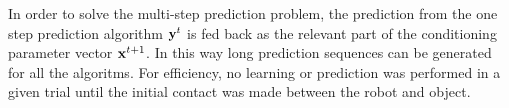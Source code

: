 %
%

In order to solve the multi-step prediction problem, the prediction from the one step prediction algorithm $\mathbf{y}^t$ is fed back as the relevant part of the conditioning parameter vector $\mathbf{x}^{t+1}$. In this way long prediction sequences can be generated for all the algoritms. For efficiency, no learning or prediction was performed in a given trial until the initial contact was made between the robot and object.
